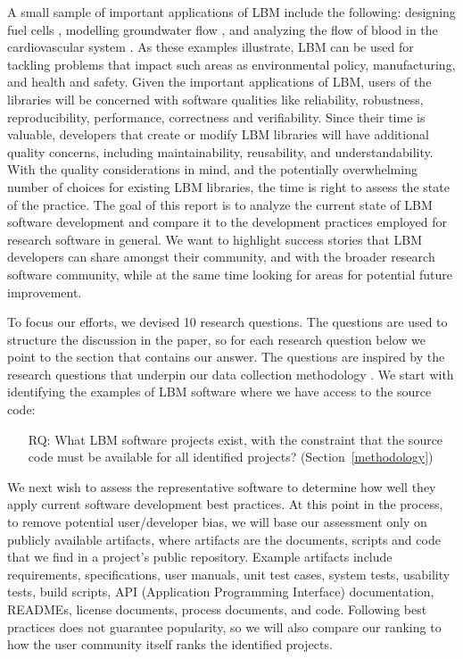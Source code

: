 \documentclass[final, 3p, times, authoryear]{elsarticle}
\newcounter{rqnum} %
\begin{document}
A small sample of important applications of LBM include the following: designing
fuel cells \citep{ZhangEtAl2018}, modelling groundwater flow
\citep{AnwarAndSukop2009}, and analyzing the flow of blood in the cardiovascular
system \citep{SadeghiEtAl2022b, SadeghiEtAl2022, SadeghiEtAl2020}.  As these
examples illustrate, LBM can be used for tackling problems that impact such
areas as environmental policy, manufacturing, and health and safety.  Given the
important applications of LBM, users of the libraries will be concerned with
software qualities like reliability, robustness, reproducibility, performance,
correctness and verifiability.  Since their time is valuable, developers that
create or modify LBM libraries will have additional quality concerns, including
maintainability, reusability, and understandability.  With the quality
considerations in mind, and the potentially overwhelming number of choices for
existing LBM libraries, the time is right to assess the state of the practice.
The goal of this report is to analyze the current state of LBM software
development and compare it to the development practices employed for research
software in general.  We want to highlight success stories that LBM developers
can share amongst their community, and with the broader research software
community, while at the same time looking for areas for potential future
improvement.

To focus our efforts, we devised 10 research questions.  The questions are used
to structure the discussion in the paper, so for each research question below we
point to the section that contains our answer.  The questions are inspired by
the research questions that underpin our data collection methodology
\citep{SmithEtAl2021}. We start with identifying the examples of LBM software
where we have access to the source code:

\begin{enumerate}
	\item[RQ\refstepcounter{rqnum}\therqnum \label{RQ_WhatProjects}:] What LBM
	software projects exist, with the constraint that the source code must be
	available for all identified projects? (Section~\ref{methodology})
\end{enumerate}

We next wish to assess the representative software to determine how well they
apply current software development best practices.  At this point in the
process, to remove potential user/developer bias, we will base our assessment
only on publicly available artifacts, where artifacts are the documents, scripts
and code that we find in a project's public repository. Example artifacts
include requirements, specifications, user manuals, unit test cases, system
tests, usability tests, build scripts, API (Application Programming Interface)
documentation, READMEs, license documents, process documents, and code.
Following best practices does not guarantee popularity, so we will also compare
our ranking to how the user community itself ranks the identified projects.
\end{document}
